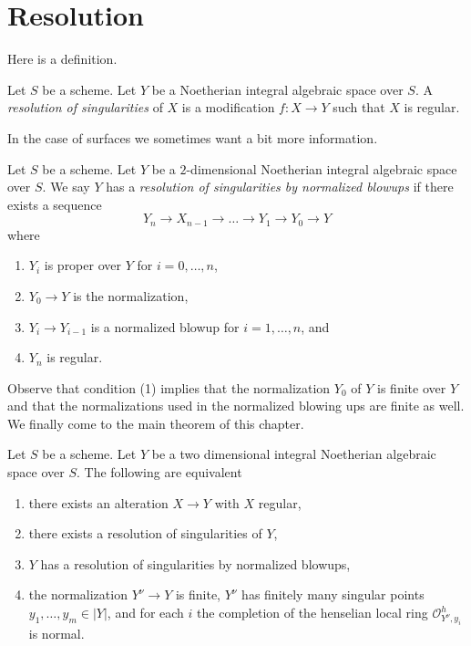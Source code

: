 










\section{Resolution}
\label{section-resolution}

\noindent
Here is a definition.

\begin{definition}
\label{definition-resolution}
Let $S$ be a scheme. Let $Y$ be a Noetherian integral algebraic space over
$S$. A {\it resolution of singularities} of $X$ is a modification
$f : X \to Y$ such that $X$ is regular.
\end{definition}

\noindent
In the case of surfaces we sometimes want a bit more information.

\begin{definition}
\label{definition-resolution-surface}
Let $S$ be a scheme. Let $Y$ be a $2$-dimensional Noetherian integral
algebraic space over $S$. We say $Y$ has a
{\it resolution of singularities by normalized blowups}
if there exists a sequence
$$
Y_n \to X_{n - 1} \to \ldots \to Y_1 \to Y_0 \to Y
$$
where
\begin{enumerate}
\item $Y_i$ is proper over $Y$ for $i = 0, \ldots, n$,
\item $Y_0 \to Y$ is the normalization,
\item $Y_i \to Y_{i - 1}$ is a normalized blowup for $i = 1, \ldots, n$, and
\item $Y_n$ is regular.
\end{enumerate}
\end{definition}

\noindent
Observe that condition (1) implies that the normalization
$Y_0$ of $Y$ is finite over $Y$ and that the normalizations
used in the normalized blowing ups are finite as well.
We finally come to the main theorem of this chapter.

\begin{theorem}
\label{theorem-resolve}
Let $S$ be a scheme. Let $Y$ be a two dimensional integral
Noetherian algebraic space over $S$. The following are equivalent
\begin{enumerate}
\item there exists an alteration $X \to Y$ with $X$ regular,
\item there exists a resolution of singularities of $Y$,
\item $Y$ has a resolution of singularities by normalized blowups,
\item the normalization $Y^\nu \to Y$ is finite, $Y^\nu$ has
finitely many singular points $y_1, \ldots, y_m \in |Y|$, and
for each $i$ the completion of the henselian local ring
$\mathcal{O}_{Y^\nu, y_i}^h$ is normal.
\end{enumerate}
\end{theorem}

